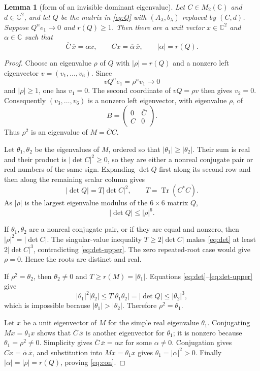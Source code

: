 \documentclass[11pt]{article}
\newtheorem{lemma}{Lemma}
\newcommand{\C}{\mathbb C}
\newcommand{\tr}{\operatorname{Tr}}
\begin{document}
\begin{lemma}[form of an invisible dominant eigenvalue]\label{lem:hidden}
Let $C\in M_2(\C)$ and $d\in\C^2$, and let $Q$ be the matrix in
\eqref{eq:Q} with $(A_\lambda,b_\lambda)$ replaced by $(C,d)$.  Suppose
$Q^ne_1\to0$ and $r(Q)\ge1$.  Then there are a unit vector $x\in\C^2$ and
$\alpha\in\C$ such that
\begin{equation}\label{eq:con}
 \overline C\,\overline x=\alpha x,
 \qquad Cx=\overline\alpha\,\overline x,
 \qquad |\alpha|=r(Q).
\end{equation}
\end{lemma}

\begin{proof}
Choose an eigenvalue $\rho$ of $Q$ with $|\rho|=r(Q)$ and a nonzero left
eigenvector $v=(v_1,\ldots,v_6)$.  Since
\[
 vQ^ne_1=\rho^n v_1\longrightarrow0
\]
and $|\rho|\ge1$, one has $v_1=0$.  The second coordinate of $vQ=\rho v$
then gives $v_2=0$.  Consequently $(v_3,\ldots,v_6)$ is a nonzero left
eigenvector, with eigenvalue $\rho$, of
\[
 B=\begin{pmatrix}0&\overline C\\C&0\end{pmatrix}.
\]
Thus $\rho^2$ is an eigenvalue of $M=\overline C C$.

Let $\theta_1,\theta_2$ be the eigenvalues of $M$, ordered so that
$|\theta_1|\ge|\theta_2|$.  Their sum is real and their product is
$|\det C|^2\ge0$, so they are either a nonreal conjugate pair or real numbers
of the same sign.  Expanding $\det Q$ first along its second row and then along
the remaining scalar column gives
\begin{equation}\label{eq:det}
 |\det Q|=T|\det C|^2,
 \qquad T=\tr(C^*C).
\end{equation}
As $|\rho|$ is the largest eigenvalue modulus of the $6\times6$ matrix $Q$,
\begin{equation}\label{eq:det-upper}
                     |\det Q|\le|\rho|^6.
\end{equation}

If $\theta_1,\theta_2$ are a nonreal conjugate pair, or if they are equal and
nonzero, then $|\rho|^2=|\det C|$.  The singular-value inequality
$T\ge2|\det C|$ makes \eqref{eq:det} at least
$2|\det C|^3$, contradicting \eqref{eq:det-upper}.  The zero repeated-root
case would give $\rho=0$.  Hence the roots are distinct and real.

If $\rho^2=\theta_2$, then $\theta_2\ne0$ and
$T\ge r(M)=|\theta_1|$.  Equations \eqref{eq:det}--\eqref{eq:det-upper} give
\[
 |\theta_1|^2|\theta_2|
 \le T|\theta_1\theta_2|
 =|\det Q|
 \le|\theta_2|^3,
\]
which is impossible because $|\theta_1|>|\theta_2|$.  Therefore
$\rho^2=\theta_1$.

Let $x$ be a unit eigenvector of $M$ for the simple real eigenvalue
$\theta_1$.  Conjugating $Mx=\theta_1x$ shows that
$\overline C\,\overline x$ is another eigenvector for $\theta_1$; it is
nonzero because $\theta_1=\rho^2\ne0$.  Simplicity gives
$\overline C\,\overline x=\alpha x$ for some $\alpha\ne0$.  Conjugation gives
$Cx=\overline\alpha\,\overline x$, and substitution into $Mx=\theta_1x$
gives $\theta_1=|\alpha|^2>0$.  Finally
$|\alpha|=|\rho|=r(Q)$, proving \eqref{eq:con}.
\end{proof}
\end{document}
